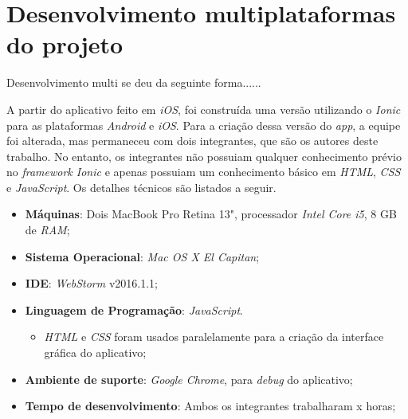 \section{Desenvolvimento multiplataformas do projeto} \label{sec:desenvolvimentomulti}

Desenvolvimento multi se deu da seguinte forma......

A partir do aplicativo feito em \textit{iOS}, foi construída uma versão utilizando o \textit{Ionic} para as plataformas \textit{Android} e \textit{iOS}.
Para a criação dessa versão do \textit{app}, a equipe foi alterada, mas permaneceu com dois integrantes, que são os autores deste trabalho.
No entanto, os integrantes não possuiam qualquer conhecimento prévio no \textit{framework Ionic}
e apenas possuiam um conhecimento básico em \textit{HTML}, \textit{CSS} e \textit{JavaScript}. Os detalhes técnicos são listados a seguir.
   
\begin{itemize}
    \item \textbf{Máquinas}: Dois MacBook Pro Retina 13", processador \textit{Intel Core i5}, 8 GB de \textit{RAM};
    \item \textbf{Sistema Operacional}: \textit{Mac OS X El Capitan};
    \item \textbf{IDE}: \textit{WebStorm} v2016.1.1;
    \item \textbf{Linguagem de Programação}: \textit{JavaScript}. 
    \begin{itemize}
        \item \textit{HTML} e \textit{CSS} foram usados paralelamente para a criação da interface gráfica do aplicativo;
    \end{itemize}
    \item \textbf{Ambiente de suporte}: \textit{Google Chrome}, para \textit{debug} do aplicativo;
    \item \textbf{Tempo de desenvolvimento}: Ambos os integrantes trabalharam x horas;
\end{itemize}


\begin{comment}
será que aqui fala das versoes do ios, ionic, cordova, angularjs? sim e explicar pq nao escolheu a versao 2 do ionic, pq eh recente e estavel
\end{comment}